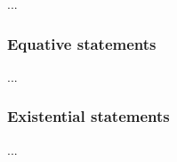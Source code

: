 ...

\subsubsection{Equative statements}
\label{subsubsec:eqs}

...

\subsubsection{Existential statements}
\label{subsubsec:exs}

...








